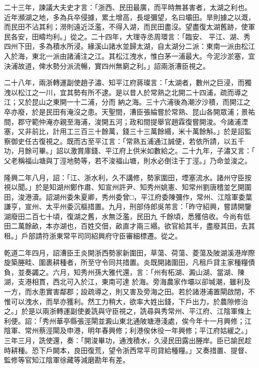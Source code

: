 \begin{pinyinscope}
 二十三年，諫議大夫史才言：「浙西、民田最廣，而平時無甚害者，太湖之利也。近年瀕湖之地，多為兵卒侵據，累土增高，長堤彌望，名曰壩田。旱則據之以溉，而民田不沾其利；澇則遠近泛濫，不得入湖，而民田盡沒。望盡復太湖舊跡，使軍民各安，田疇均利。」從之。二十四年，大理寺丞周環言：「臨安、
 平江、湖、秀四州下田，多為積水所浸。緣溪山諸水並歸太湖，自太湖分二派：東南一派由松江入於海，東北一派由諸浦注之江。其松江洩水，惟白茅一浦最大。今泥沙淤塞，宜決浦故道，俾水勢分派流暢，實四州無窮之利。」詔兩浙漕臣視之。



 二十八年，兩浙轉運副使趙子潚、知平江府蔣璨言：「太湖者，數州之巨浸，而獨洩以松江之一川，宜其勢有所不逮。是以昔人於常熟之北開二十四浦，疏而導之江；又於昆山之東開一十二浦，分而
 納之海。三十六浦後為潮汐沙積，而開江之卒亦廢，於是民田有淹沒之患。天聖間，漕臣張綸嘗於常熟、昆山各開眾浦；景祐間，郡守範仲淹亦親至海浦，浚開五河；政和間提舉官趙霖復嘗開浚。今諸浦湮塞，又非前比，計用工三百三十餘萬，錢三十三萬餘緡，米十萬餘斛。」於是詔監察御史任古復視之。既而古至平江言：「常熟五浦通江誠便，若依所請，以五千功，月餘可畢。」詔以激賞庫錢、平江府上供米如數給之。二十九年，子潚又言：「
 父老稱福山塘與丁涇地勢等，若不浚福山塘，則水必倒注于丁涇。」乃命並浚之。



 隆興二年八月，詔：「江、浙水利，久不講修，勢家圍田，堙塞流水。諸州守臣按視以聞。」於是知湖州鄭作肅、知宣州許尹、知秀州姚憲、知常州劉唐稽並乞開圍田，浚港瀆。詔湖州委朱夏卿，秀州委曾□，平江府委陳彌作，常州、江陰軍委葉謙亨，宣州、太平州委沉樞措置。九月，刑部侍郎吳芾言：「昨守紹興，嘗請開鑒湖廢田二百七十頃，復湖之舊，水無泛濫，民田九
 千餘頃，悉獲倍收。今尚有低田二萬餘畝，本亦湖也，百姓交佃，畝直才兩三緡。欲官給其半，盡廢其田，去其租。」戶部請符浙東常平司同紹興府守臣審細標遷。從之。



 乾道二年四月，詔漕臣王炎開浙西勢家新圍田，草蕩、荷蕩、菱蕩及陂湖溪港岸際旋築塍畦、圍裹耕種者，所至守令同共措置。炎既開諸圍田，凡租戶貸主家種糧債負，並奏蠲之。六月，知秀州孫大雅代還，言：「州有柘湖、澱山湖、當湖、陳湖，支港相貫，西北可入於江，東南可達
 於海。旁海農家作壩以卻堿潮，雖利及一方，而水患實害鄰郡；設疏導之，則又害及旁海之田。若於諸港浦置閘啟閉，不惟可以洩水，而旱亦獲利。然工力稍大，欲率大姓出錢，下戶出力，於農隙修治之。」於是以兩浙轉運副使姜詵與守臣視之，詵尋與秀常州、平江府、江陰軍條上利便。詔：「秀州華亭縣張涇閘並澱山東北通陂塘港淺處，俟今年十一月興修；江陰軍、常州蔡涇閘及申港，明年春興修；利港俟休役一年興修；平江府姑緩之。」
 三年三月，詵使還，奏：「開浚畢功，通洩積水，久浸民田露出塍岸。臣已諭民趁時耕種。恐下戶闕本，良田復荒，望令浙西常平司貸給種糧。」又奏措置、提督、監修等官知江陰軍徐藏等減磨勘年有差。




\end{pinyinscope}
